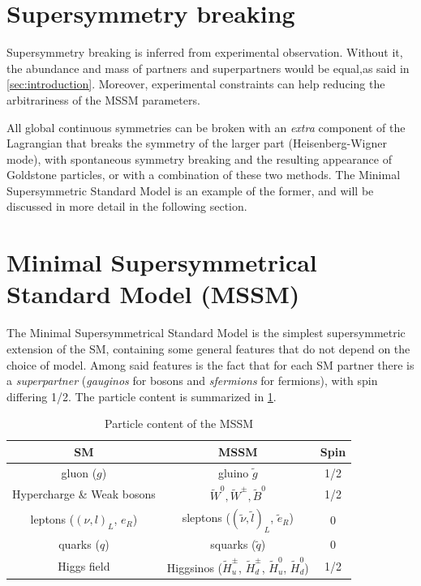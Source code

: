 \section{Supersymmetry breaking} %
\label{sec:SUSYbreak}
Supersymmetry breaking is inferred from experimental observation. Without it, the abundance and mass of partners and superpartners would be equal,as said in \ref{sec:introduction}. Moreover, experimental constraints can help reducing the arbitrariness of the MSSM parameters. 

All global continuous symmetries can be broken with an \textit{extra} component of the Lagrangian that breaks the symmetry of the larger part (Heisenberg-Wigner mode), with spontaneous symmetry breaking and the resulting appearance of Goldstone particles, or with a combination of these two methods. The Minimal Supersymmetric Standard Model is an example of the former, and will be discussed in more detail in the following section. 

\section{Minimal Supersymmetrical Standard Model (MSSM)}
\label{sec:MSSM}
The Minimal Supersymmetrical Standard Model is the simplest supersymmetric extension of the SM, containing some general features that do not depend on the choice of model. Among said features is the fact that for each SM partner there is a \textit{superpartner} (\textit{gauginos} for bosons and \textit{sfermions} for fermions), with spin differing 1/2. The particle content is summarized in \ref{tab:parMSSM}.

\begin{table}[h]
  \begin{center}
     \caption{Particle content of the MSSM}
  \label{tab:parMSSM}
  \begin{tabular}{|c|c|c|}
  \hline
  SM & MSSM & Spin \\
    \hline
    gluon ($g$) & gluino $\tilde{g}$ & 1/2\\
    Hypercharge \& Weak bosons & $\tilde{W}^0,\tilde{W}^{\pm}, \tilde{B}^0$ & 1/2 \\
    leptons ($(\nu, l)_L$, $e_R$) & sleptons ($(\tilde{\nu},\tilde{l})_L$, $\tilde{e}_R$) & 0\\
    quarks ($q$) & squarks ($\tilde{q}$) & 0\\
    Higgs field & Higgsinos ($\tilde{H}_u^{\pm}$, $\tilde{H}_d^{\pm}$, $\tilde{H}_u^{0}$, $\tilde{H}_d^{0}$) & 1/2\\
    \hline
  \end{tabular}
  \end{center}
\end{table}

